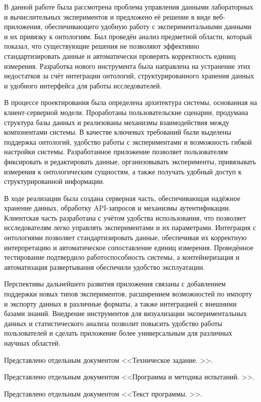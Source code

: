
В данной работе была рассмотрена проблема управления данными лабораторных и вычислительных экспериментов и предложено её решение в виде веб-приложения, обеспечивающего удобную работу с экспериментальными данными и их привязку к онтологиям. Был проведён анализ предметной области, который показал, что существующие решения не позволяют эффективно стандартизировать данные и автоматически проверять корректность единиц измерения. Разработка нового инструмента была направлена на устранение этих недостатков за счёт интеграции онтологий, структурированного хранения данных и удобного интерфейса для работы исследователей.

В процессе проектирования была определена архитектура системы, основанная на клиент-серверной модели. Проработаны пользовательские сценарии, продумана структура базы данных и реализованы механизмы взаимодействия между компонентами системы. В качестве ключевых требований были выделены поддержка онтологий, удобство работы с экспериментами и возможность гибкой настройки системы. Разработанное приложение позволяет пользователям фиксировать и редактировать данные, организовывать эксперименты, привязывать измерения к онтологическим сущностям, а также получать удобный доступ к структурированной информации.

В ходе реализации была создана серверная часть, обеспечивающая надёжное хранение данных, обработку API-запросов и механизмы аутентификации. Клиентская часть разработана с учётом удобства использования, что позволяет исследователям легко управлять экспериментами и их параметрами. Интеграция с онтологиями позволяет стандартизировать данные, обеспечивая их корректную интерпретацию и автоматическое сопоставление единиц измерения. Проведённое тестирование подтвердило работоспособность системы, а контейнеризация и автоматизация развертывания обеспечили удобство эксплуатации.

Перспективы дальнейшего развития приложения связаны с добавлением поддержки новых типов экспериментов, расширением возможностей по импорту и экспорту данных в различные форматы, а также интеграцией с внешними базами знаний. Внедрение инструментов для визуализации экспериментальных данных и статистического анализа позволит повысить удобство работы пользователей и сделать приложение более универсальным для различных научных областей.

\newpage
\printbibliography[title=Список источников, heading=bibintoc]
\newpage

Представлено отдельным документом <<Техническое задание. \unskip>>.


Представлено отдельным документом <<Программа и методика испытаний. \unskip>>.

Представлено отдельным документом <<Текст программы. \unskip>>.